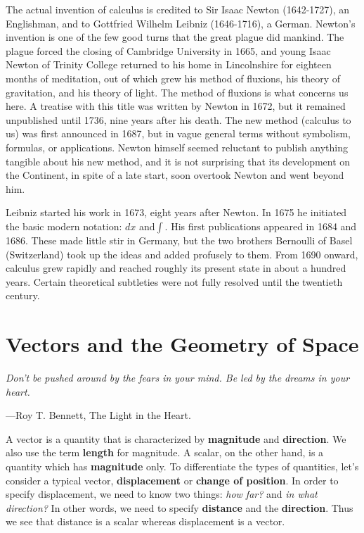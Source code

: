 \documentclass[titlepage,a4paper,12pt]{report}
\begin{document}
\noindent The actual invention of calculus is credited to Sir Isaac Newton (1642-1727),
an Englishman, and to Gottfried Wilhelm Leibniz (1646-1716), a German. Newton's
invention is one of the few good turns that the great plague did mankind. The plague
forced the closing of Cambridge University in 1665, and young Isaac Newton of Trinity
College returned to his home in Lincolnshire for eighteen months of meditation, out
of which grew his method of fluxions, his theory of gravitation, and his theory of light.
The method of fluxions is what concerns us here. A treatise with this title was written
by Newton in 1672, but it remained unpublished until 1736, nine years after his death.
The new method (calculus to us) was first announced in 1687, but in vague general
terms without symbolism, formulas, or applications. Newton himself seemed reluctant
to publish anything tangible about his new method, and it is not surprising that its
development on the Continent, in spite of a late start, soon overtook Newton and went
beyond him.

\noindent Leibniz started his work in 1673, eight years after Newton. In 1675 he initiated the
basic modern notation: $dx$ and$\int$. His first publications appeared in 1684 and 1686. These
made little stir in Germany, but the two brothers Bernoulli of Basel (Switzerland) took
up the ideas and added profusely to them. From 1690 onward, calculus grew rapidly and
reached roughly its present state in about a hundred years. Certain theoretical subtleties
were not fully resolved until the twentieth century.
\chapter{Vectors and the Geometry of Space}
\begin{center}
	\small{\parbox{18cm}{
		\begin{raggedright}
		{\small
		\textit{Don't be pushed around by the fears in your mind. Be led by the dreams in your heart.}
 }
 
				\vspace{.5cm}\hfill{---Roy T. Bennett, The Light in the Heart.}
		\end{raggedright}
	}
} 
\end{center}
A vector is a quantity that is characterized by \textbf{magnitude} and \textbf{direction}. We also use the term \textbf{length} for magnitude. A scalar, on the other hand, is a quantity which has \textbf{magnitude} only. To differentiate the types of quantities, let's consider a typical vector, \textbf{displacement} or \textbf{change of position}. In order to specify displacement, we need to know two things: \textit{how far?} and \textit{in what direction?} In other words, we need to specify \textbf{distance} and the \textbf{direction}. Thus we see that distance is a scalar whereas displacement is a vector.
\end{document}
